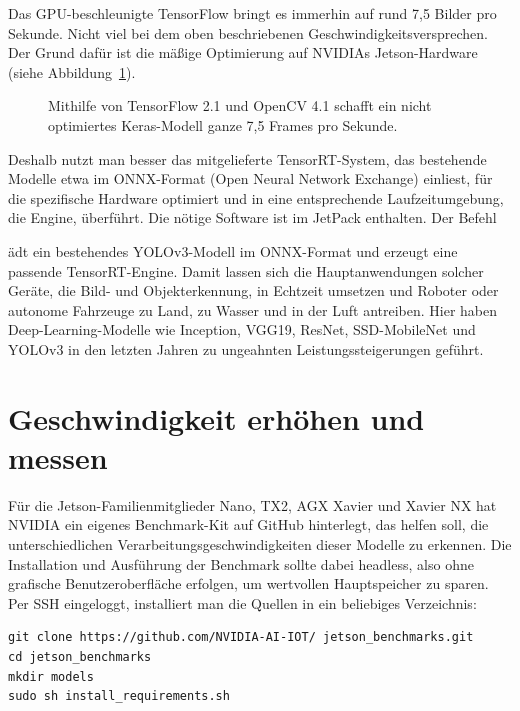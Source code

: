 Das GPU-beschleunigte TensorFlow bringt es immerhin auf rund 7,5 Bilder pro Sekunde. Nicht viel bei dem oben beschriebenen Geschwindigkeitsversprechen. Der Grund dafür ist die mäßige Optimierung auf NVIDIAs Jetson-Hardware (siehe Abbildung~\ref{XavierNXFace}). 

\begin{figure}
	
	\caption{Mithilfe von TensorFlow 2.1 und OpenCV 4.1 schafft ein nicht optimiertes Keras-Modell ganze 7,5 Frames pro Sekunde.} \label{XavierNXFace}
	
\end{figure}


Deshalb nutzt man besser das mitgelieferte TensorRT-System, das bestehende Modelle etwa im ONNX-Format (Open Neural Network Exchange) einliest, für die spezifische Hardware optimiert und in eine entsprechende Laufzeitumgebung, die Engine, überführt. Die nötige Software ist im JetPack enthalten. Der Befehl 



ädt ein bestehendes YOLOv3-Modell im ONNX-Format und erzeugt eine passende TensorRT-Engine. Damit lassen sich die Hauptanwendungen solcher Geräte, die Bild- und Objekterkennung, in Echtzeit umsetzen und Roboter oder autonome Fahrzeuge zu Land, zu Wasser und in der Luft antreiben. Hier haben Deep-Learning-­Modelle wie Inception, VGG19, ResNet, SSD-MobileNet und YOLOv3 in den letzten Jahren zu ungeahnten Leistungssteigerungen geführt. 

\section{Geschwindigkeit erhöhen und messen}

Für die Jetson-Familienmitglieder Nano, TX2, AGX Xavier und Xavier NX hat NVIDIA ein eigenes Benchmark-Kit auf GitHub hinterlegt, das helfen soll, die unterschiedlichen Verarbeitungsgeschwindigkeiten dieser Modelle zu erkennen. Die Installation und Ausführung der Benchmark sollte dabei headless, also ohne grafische Benutzeroberfläche erfolgen, um wertvollen Hauptspeicher zu sparen. Per SSH eingeloggt, installiert man die Quellen in ein beliebiges Verzeichnis: 

\begin{lstlisting}
git clone https://github.com/NVIDIA-AI-IOT/ jetson_benchmarks.git
cd jetson_benchmarks
mkdir models
sudo sh install_requirements.sh
\end{lstlisting}

